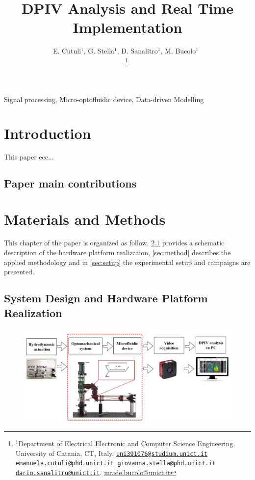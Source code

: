 \documentclass[journal]{IEEEtran}
\title{DPIV Analysis and Real Time Implementation}
\author{E. Cutuli${^{1}}$, G. Stella${^{1}}$, D. Sanalitro${^{1}}$, M. Bucolo${^{1}}$~\IEEEmembership{Senior Member,~IEEE}

\thanks{$^1$Department of Electrical Electronic and Computer Science Engineering, University of Catania, CT, Italy. {\tt \scriptsize\href{mailto:uni391076@studium.unict.it}{\mbox{uni391076@studium.unict.it}}
\scriptsize\href{mailto:emaunuela.cutuli@phd.unict.it}{\mbox{emanuela.cutuli@phd.unict.it}}
\scriptsize\href{mailto:giovanna.stella@phd.unict.it}{\mbox{giovanna.stella@phd.unict.it}}
\scriptsize\href{mailto:dario.sanalitro@unict.it}{\mbox{dario.sanalitro@unict.it}}}. 
\scriptsize\href{mailto:maide.bucolo@unict.it}{\mbox{maide.bucolo@unict.it}}}. 
}
\theoremstyle{definition}
\theoremstyle{remark}
\begin{document}


\maketitle

\begin{abstract}

\end{abstract}

\begin{IEEEkeywords}
	Signal processing, Micro-optofluidic device, Data-driven Modelling
\end{IEEEkeywords}

\section{Introduction}

This paper ecc...

\subsection{Paper main contributions}


\section{Materials and Methods}
This chapter of the paper is organized as follow. \sect\ref{sec:design} provides a schematic description of the hardware platform realization, \sect\ref{sec:method} describes the applied methodology and in \sect\ref{sec:setup} the experimental setup and campaigns are presented.

\subsection{System Design and Hardware Platform Realization}\label{sec:design}

\begin{figure}[t]
	\centering
	\includegraphics[width=2\columnwidth]{images/PlatformDesign}
\end{figure}
\end{document}
